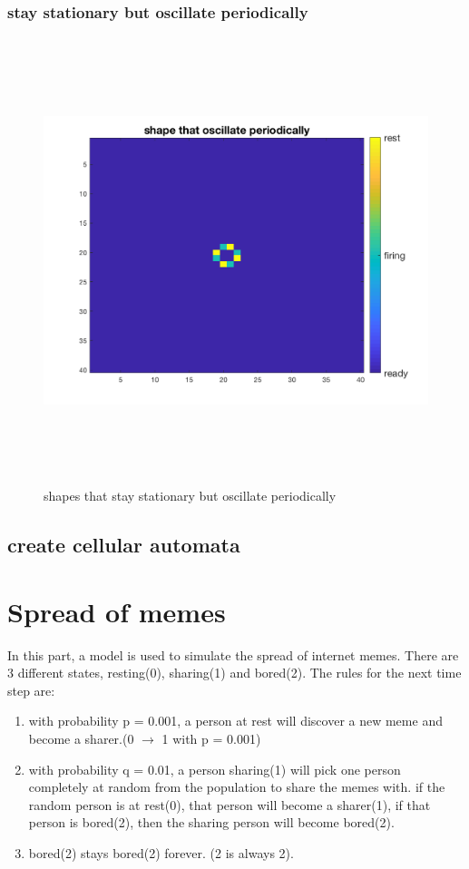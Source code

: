 \documentclass[12pt]{article}
\begin{document}
\subsubsection{stay stationary but oscillate periodically}
\begin{figure}[H] %
\centering
\includegraphics[width = 16 cm, height = 13cm]{task2_4.png}
\caption{shapes that stay stationary but oscillate periodically}
\label{fig:task2_4}
\end{figure}


\subsection{create cellular automata}

\section{Spread of memes}
\doublespacing
In this part, a model is used to simulate the spread of internet memes. There are 3 different states, resting(0), sharing(1) and bored(2). The rules for the next time step are:

\begin{enumerate}
\item with probability p = 0.001, a person at rest will discover a new meme and become a sharer.(0 $\rightarrow$ 1 with p = 0.001) 
\item with probability q = 0.01, a person sharing(1) will pick one person completely at random from the population to share the memes with. if the random person is at rest(0), that person will become a sharer(1), if that person is bored(2), then the sharing person will become bored(2). 
\item bored(2) stays bored(2) forever. (2 is always 2).
\end{enumerate}
\end{document}

